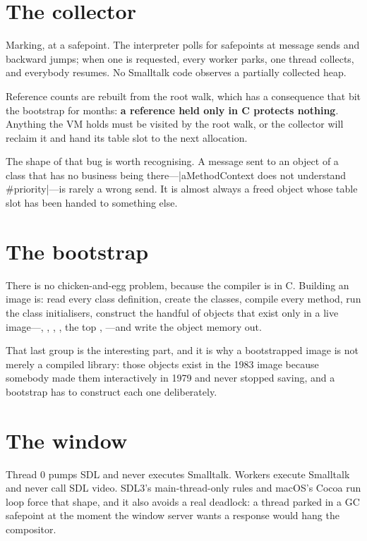 \section{The collector}

Marking, at a safepoint. The interpreter polls for safepoints at message sends
and backward jumps; when one is requested, every worker parks, one thread
collects, and everybody resumes. No Smalltalk code observes a partially
collected heap.

Reference counts are rebuilt from the root walk, which has a consequence that
bit the bootstrap for months: \textbf{a reference held only in C protects
nothing}. Anything the VM holds must be visited by the root walk, or the
collector will reclaim it and hand its table slot to the next allocation.

The shape of that bug is worth recognising. A message sent to an object of a
class that has no business being there---\ct|aMethodContext does not understand #priority|---is rarely a wrong send. It is almost always a freed
object whose table slot has been handed to something else.

\section{The bootstrap}

There is no chicken-and-egg problem, because the compiler is in C. Building an
image is: read every class definition, create the classes, compile every
method, run the class initialisers, construct the handful of objects that
exist only in a live image---, ,
, , the top , ---and write
the object memory out.

That last group is the interesting part, and it is why a bootstrapped image is
not merely a compiled library: those objects exist in the 1983 image because
somebody made them interactively in 1979 and never stopped saving, and a
bootstrap has to construct each one deliberately.

\section{The window}

Thread 0 pumps SDL and never executes Smalltalk. Workers execute Smalltalk and
never call SDL video. SDL3's main-thread-only rules and macOS's Cocoa run loop
force that shape, and it also avoids a real deadlock: a thread parked in a GC
safepoint at the moment the window server wants a response would hang the
compositor.

